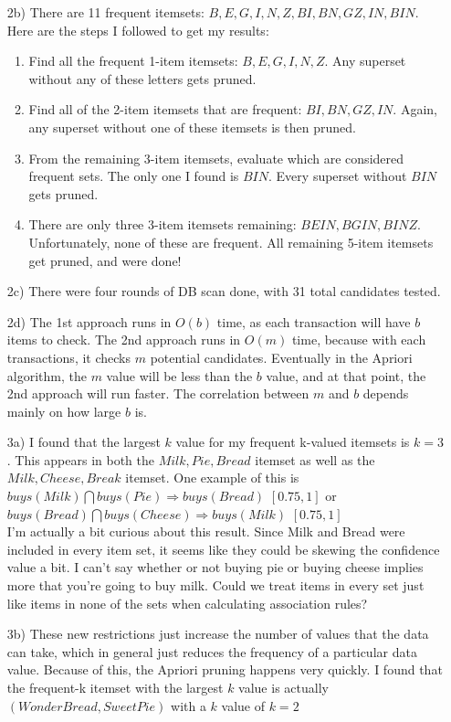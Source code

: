 \documentclass[12pt]{article}
\begin{document}
\begin{enumerate}
\item[2b)] There are 11 frequent itemsets: ${B,E,G,I,N,Z,BI,BN,GZ,IN,BIN}$.  Here are the steps I followed to get my results:\\
	\begin{enumerate}
	\item Find all the frequent 1-item itemsets: ${B,E,G,I,N,Z}$. Any superset without any of these letters gets pruned.\\
	\item Find all of the 2-item itemsets that are frequent: ${BI,BN,GZ,IN}$.  Again, any superset without one of these itemsets is then pruned.
	\item From the remaining 3-item itemsets, evaluate which are considered frequent sets.  The only one I found is ${BIN}$.  Every superset without ${BIN}$ gets pruned.
	\item There are only three 3-item itemsets remaining: ${BEIN,BGIN,BINZ}$.  Unfortunately, none of these are frequent.  All remaining 5-item itemsets get pruned, and were done! 
	\end{enumerate}
	
\item[2c)] There were four rounds of DB scan done, with 31 total candidates tested.

\item[2d)] The 1st approach runs in $O(b)$ time, as each transaction will have $b$ items to check.  The 2nd approach runs in $O(m)$ time, because with each transactions, it checks $m$ potential candidates.  Eventually in the Apriori algorithm, the $m$ value will be less than the $b$ value, and at that point, the 2nd approach will run faster.  The correlation between $m$ and $b$ depends mainly on how large $b$ is.

\item[3a)] I found that the largest $k$ value for my frequent k-valued itemsets is $k=3$.  This appears in both the ${Milk, Pie, Bread}$ itemset as well as the ${Milk, Cheese, Break}$ itemset.  One example of this is \\
$buys(Milk) \bigcap buys(Pie) \Rightarrow buys(Bread)$  $[0.75,1]$ or\\
$buys(Bread) \bigcap buys(Cheese) \Rightarrow buys(Milk)$  $[0.75,1]$\\
I'm actually a bit curious about this result. Since Milk and Bread were included in every item set, it seems like they could be skewing the confidence value a bit.  I can't say whether or not buying pie or buying cheese implies more that you're going to buy milk. Could we treat items in every set just like items in none of the sets when calculating association rules?

\item[3b)] These new restrictions just increase the number of values that the data can take, which in general just reduces the frequency of a particular data value.  Because of this, the Apriori pruning happens very quickly.  I found that the frequent-k itemset with the largest $k$ value is actually ${(WonderBread,SweetPie)}$ with a $k$ value of $k=2$


\end{enumerate}
\end{document}
